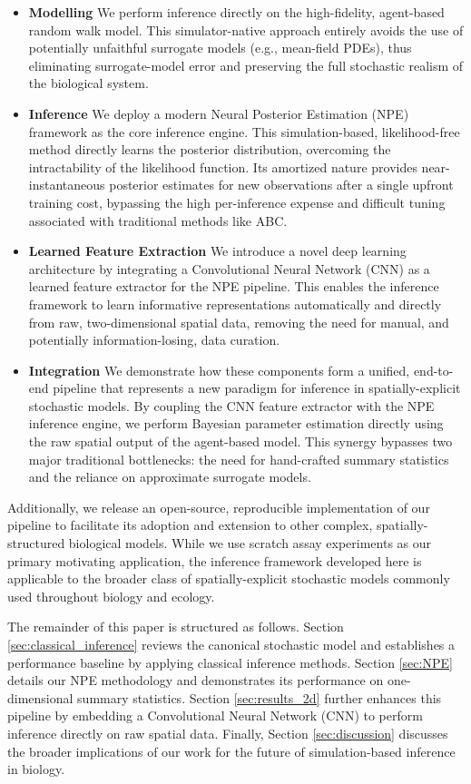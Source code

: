 \documentclass{article}
\begin{document}
\begin{itemize}
	\item \textbf{Modelling} We perform inference directly on the high-fidelity, agent-based random walk model. This simulator-native approach entirely avoids the use of potentially unfaithful surrogate models (e.g., mean-field PDEs), thus eliminating surrogate-model error and preserving the full stochastic realism of the biological system.
	\item \textbf{Inference} We deploy a modern Neural Posterior Estimation (NPE) framework as the core inference engine. This simulation-based, likelihood-free method directly learns the posterior distribution, overcoming the intractability of the likelihood function. Its amortized nature provides near-instantaneous posterior estimates for new observations after a single upfront training cost, bypassing the high per-inference expense and difficult tuning associated with traditional methods like ABC.
	\item \textbf{Learned Feature Extraction} We introduce a novel deep learning architecture by integrating a Convolutional Neural Network (CNN) as a learned feature extractor for the NPE pipeline. This enables the inference framework to learn informative representations automatically and directly from raw, two-dimensional spatial data, removing the need for manual, and potentially information-losing, data curation.
	\item \textbf{Integration} We demonstrate how these components form a unified, end-to-end pipeline that represents a new paradigm for inference in spatially-explicit stochastic models. By coupling the CNN feature extractor with the NPE inference engine, we perform Bayesian parameter estimation directly using the raw spatial output of the agent-based model. This synergy bypasses two major traditional bottlenecks: the need for hand-crafted summary statistics and the reliance on approximate surrogate models.
\end{itemize}
Additionally, we release an open-source, reproducible implementation of our pipeline to facilitate its adoption and extension to other complex, spatially-structured biological models. While we use scratch assay experiments as our primary motivating application, the inference framework developed here is applicable to the broader class of spatially-explicit stochastic models commonly used throughout biology and ecology.


The remainder of this paper is structured as follows. Section \ref{sec:classical_inference} reviews the canonical stochastic model and establishes a performance baseline by applying classical inference methods. Section \ref{sec:NPE} details our NPE methodology and demonstrates its performance on one-dimensional summary statistics. Section \ref{sec:results_2d} further enhances this pipeline by embedding a Convolutional Neural Network (CNN) to perform inference directly on raw spatial data. Finally, Section \ref{sec:discussion} discusses the broader implications of our work for the future of simulation-based inference in biology.
\end{document}
